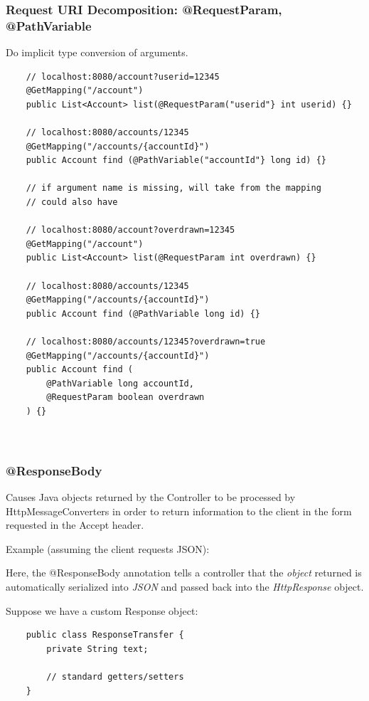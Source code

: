 \documentclass{scrartcl}
\begin{document}
\subsubsection{Request URI Decomposition: @RequestParam, @PathVariable}

Do implicit type conversion of arguments.

\begin{lstlisting}
    // localhost:8080/account?userid=12345
    @GetMapping("/account")
    public List<Account> list(@RequestParam("userid"} int userid) {}

    // localhost:8080/accounts/12345
    @GetMapping("/accounts/{accountId}")
    public Account find (@PathVariable("accountId"} long id) {}

    // if argument name is missing, will take from the mapping
    // could also have

    // localhost:8080/account?overdrawn=12345
    @GetMapping("/account")
    public List<Account> list(@RequestParam int overdrawn) {}

    // localhost:8080/accounts/12345
    @GetMapping("/accounts/{accountId}")
    public Account find (@PathVariable long id) {}

    // localhost:8080/accounts/12345?overdrawn=true
    @GetMapping("/accounts/{accountId}")
    public Account find (
        @PathVariable long accountId,
        @RequestParam boolean overdrawn
    ) {}



\end{lstlisting}

\subsubsection{@ResponseBody}

Causes Java objects returned by the Controller to be processed by HttpMessageConverters in order to return information to the client in the form requested in the Accept header.

Example (assuming the client requests JSON):

Here, the @ResponseBody annotation tells a controller that the \textit{object} returned is automatically serialized into \textit{JSON} and passed back into the \textit{HttpResponse} object.

Suppose we have a custom Response object:

\begin{lstlisting}
    public class ResponseTransfer {
        private String text;

        // standard getters/setters
    }
\end{lstlisting}
\end{document}
